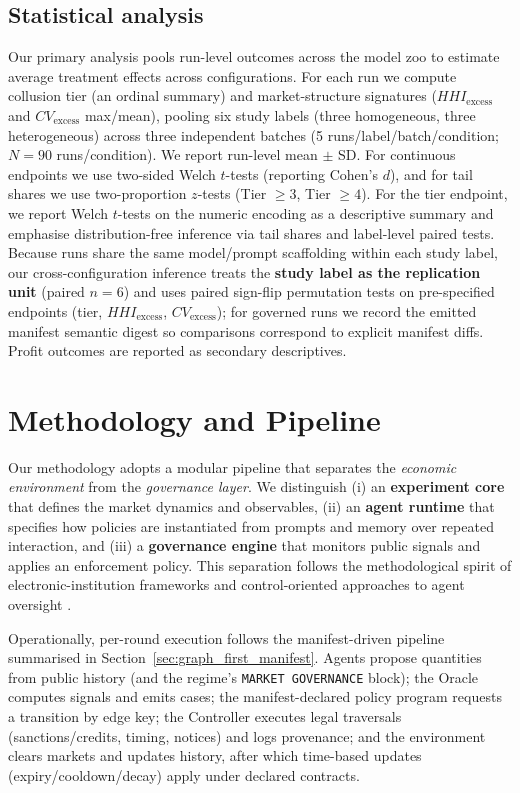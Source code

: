 \documentclass[11pt, a4paper]{article}
\begin{document}
\subsection{Statistical analysis}
Our primary analysis pools run-level outcomes across the model zoo to estimate average treatment effects across configurations. For each run we compute collusion tier (an ordinal summary) and market-structure signatures ($HHI_{\mathrm{excess}}$ and $CV_{\mathrm{excess}}$ max/mean), pooling six study labels (three homogeneous, three heterogeneous) across three independent batches (5 runs/label/batch/condition; $N=90$ runs/condition). We report run-level mean $\pm$ SD. For continuous endpoints we use two-sided Welch $t$-tests (reporting Cohen's $d$), and for tail shares we use two-proportion $z$-tests (Tier $\geq 3$, Tier $\geq 4$). For the tier endpoint, we report Welch $t$-tests on the numeric encoding as a descriptive summary and emphasise distribution-free inference via tail shares and label-level paired tests. Because runs share the same model/prompt scaffolding within each study label, our cross-configuration inference treats the \textbf{study label as the replication unit} (paired $n=6$) and uses paired sign-flip permutation tests on pre-specified endpoints (tier, $HHI_{\mathrm{excess}}$, $CV_{\mathrm{excess}}$); for governed runs we record the emitted manifest semantic digest so comparisons correspond to explicit manifest diffs. Profit outcomes are reported as secondary descriptives.

\section{Methodology and Pipeline}
\label{sec:methodology}

Our methodology adopts a modular pipeline that separates the \emph{economic environment} from the \emph{governance layer}. We distinguish (i) an \textbf{experiment core} that defines the market dynamics and observables, (ii) an \textbf{agent runtime} that specifies how policies are instantiated from prompts and memory over repeated interaction, and (iii) a \textbf{governance engine} that monitors public signals and applies an enforcement policy. This separation follows the methodological spirit of electronic-institution frameworks \citep{Arcos2005ElectronicInstitutions} and control-oriented approaches to agent oversight \citep{Greenblatt2024AIControl}.

Operationally, per-round execution follows the manifest-driven pipeline summarised in Section~\ref{sec:graph_first_manifest}. Agents propose quantities from public history (and the regime’s \texttt{MARKET GOVERNANCE} block); the Oracle computes signals and emits cases; the manifest-declared policy program requests a transition by edge key; the Controller executes legal traversals (sanctions/credits, timing, notices) and logs provenance; and the environment clears markets and updates history, after which time-based updates (expiry/cooldown/decay) apply under declared contracts.
\end{document}
